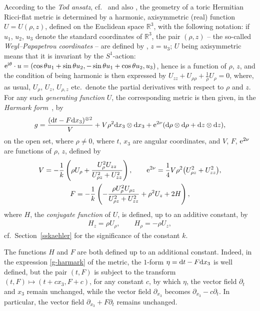 \documentclass[pdftex]{sigma}
\numberwithin{equation}{section}
\begin{document}
According to the {\it Tod ansatz}, cf.\ \cite{T} and also \cite[Section~3]{BG}, the geometry of a toric Hermitian Ricci-flat metric is determined by a harmonic, axisymmetric (real) function $U = U(\rho, z)$, defined on the Euclidean space $\mathbb{R} ^3$, with the following notation: if $u_1$, $u_2$, $u_3$ denote the standard coordinates of $\mathbb{R} ^3$, the pair $(\rho, z)$ -- the so-called {\it Weyl--Papapetrou coordinates} -- are defined by , $z = u _3$; $U$ being axisymmetric means that it is invariant by the $S^1$-action: ${\rm e}^{{\rm i} \theta} \cdot u = (\cos{\theta} u_1 + \sin{\theta} u_2, - \sin{\theta} u_1 + \cos{\theta} u_2, u_3)$, hence is a function of $\rho$, $z$, and the condition of being harmonic is then expressed by $U_{z z} + U_{\rho \rho} + \frac{1}{\rho} U_{\rho} = 0$, where, as usual, $U_{\rho}$, $U_z$, $U _{\rho, z}$ etc.\ denote the partial derivatives with respect to $\rho$ and $z$.
For any such {\it generating function} $U$, the corresponding metric is then given, in the {\it Harmark form}~\cite{CT1,harmark}, by
\begin{gather} \label{g-harmark} g = \frac{({\rm d}t - F {\rm d} x _3) ^{\otimes 2}}{V} + V \rho ^2 {\rm d} x _3 \otimes {\rm d} x _3 + {\rm e}^{2 \nu} ({\rm d} \rho \otimes {\rm d} \rho + {\rm d} z \otimes {\rm d} z), \end{gather}
on the open set, where $\rho \neq 0$,
where $t$, $x_3$ are angular coordinates, and $V$, $F$, ${\rm e}^{2 \nu}$ are functions of $\rho$, $z$, defined by
\begin{gather} V = - \frac{1}{k} \left(\rho U_{\rho} + \frac{U_{\rho} ^2 U_{z z}}{U_{\rho z} ^2 + U _{z z} ^2}\right), \qquad {\rm e}^{2 \nu} = \frac{1}{4} V \rho ^2 \big(U_{\rho z} ^2 + U_{z z} ^2\big), \label{V-nu}\\
F = - \frac{1}{k} \left(- \frac{\rho U_{\rho} ^2 U_{\rho z}}{U_{\rho z}^2 + U_{z z} ^2} + \rho ^2 U_z + 2 H\right), \label{F} \end{gather}
where $H$, the {\it conjugate function} of $U$, is defined, up to an additive constant, by
\begin{gather} \label{H} H _z = \rho U _{\rho}, \qquad H _{\rho} = - \rho U_z, \end{gather}
cf.\ Section~\ref{sskaehler} for the significance of the constant $k$.


The functions $H$ and $F$ are both defined up to an additional constant. Indeed, in the expression \eqref{g-harmark} of the metric, the $1$-form $\eta = {\rm d}t - F {\rm d} x _3$ is well defined, but the pair $(t, F)$ is subject to the transform $(t, F) \mapsto (t + c x_3, F + c)$, for any constant $c$, by which $\eta$, the vector field $\partial _t$ and $x _3$ remain unchanged, while the vector field $\partial _{x_3}$ becomes $\partial _{x _3} - c \partial _t$. In particular, the vector field $\partial _{x_3} + F \partial _t$ remains unchanged.
\end{document}
